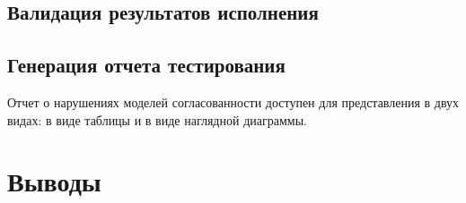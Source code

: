 \documentclass[14pt, openany]{book}
\begin{document}
\section{Валидация результатов исполнения}

\section{Генерация отчета тестирования}
Отчет о нарушениях моделей согласованности доступен для представления в двух видах: в виде таблицы и в виде наглядной диаграммы.
\chapter{Выводы}



\end{document}
